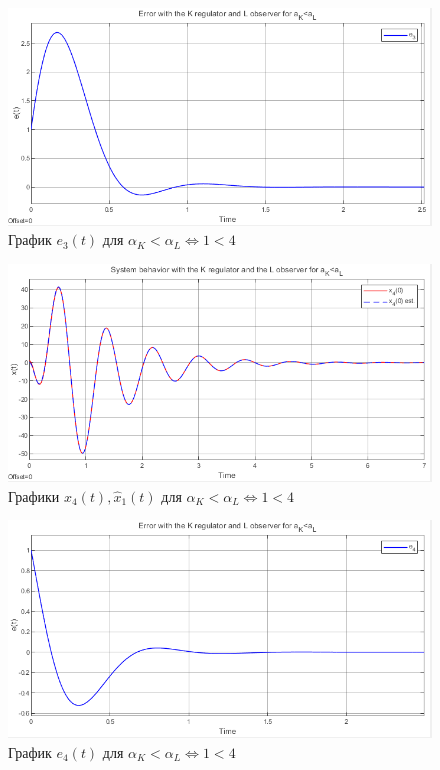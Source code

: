 \documentclass[a4paper, 12pt]{article}
\begin{document}
    \begin{figure}[H]
        \centering
        \includegraphics[scale=0.8]{2task_aKlaL_e3.png}
        \captionsetup{skip=0pt}
        \caption{График $e_3(t)$ для $\alpha_K<\alpha_L\Leftrightarrow1<4$}
        \label{2task_aKlaL_e3}
    \end{figure}
    \newpage
    \vspace*{20mm}
    \begin{figure}[H]
        \centering
        \includegraphics[scale=0.8]{2task_aKlaL_x4.png}
        \captionsetup{skip=0pt}
        \caption{Графики $x_4(t),\hat{x}_1(t)$ для $\alpha_K<\alpha_L\Leftrightarrow1<4$}
        \label{2task_aKlaL_x4}
    \end{figure}
    \begin{figure}[H]
        \centering
        \includegraphics[scale=0.8]{2task_aKlaL_e4.png}
        \captionsetup{skip=0pt}
        \caption{График $e_4(t)$ для $\alpha_K<\alpha_L\Leftrightarrow1<4$}
        \label{2task_aKlaL_e4}
    \end{figure}
\end{document}
